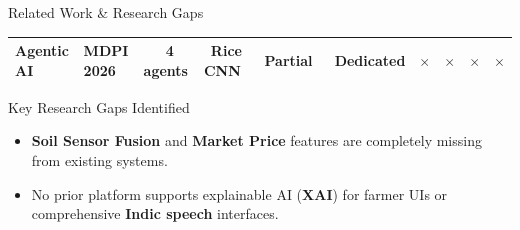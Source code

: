 \documentclass[aspectratio=169, 10pt]{beamer}
\newcommand{\ok}[1]{{\color{green!60!black}\textbf{\checkmark}\ \scriptsize #1}}
\newcommand{\ko}{{\color{red!70!black}\textbf{$\times$}}}
\begin{document}
\begin{frame}{Related Work \& Research Gaps}
{\begin{tabular}{llcccccccc}
            Agentic AI \cite{agenticmdpi2026} & MDPI 2026 & \ok{4 agents} & \ok{Rice CNN} & \ok{Partial} & \ok{Dedicated} & \ko & \ko & \ko & \ko \\
            \bottomrule
        \end{tabular}
    }
    \vspace{0.15cm}
    \begin{block}{\footnotesize Key Research Gaps Identified}
        \footnotesize
        \begin{itemize}
            \item \textbf{Soil Sensor Fusion} and \textbf{Market Price} features are completely missing from existing systems.
            \item No prior platform supports explainable AI (\textbf{XAI}) for farmer UIs or comprehensive \textbf{Indic speech} interfaces.
        \end{itemize}
    \end{block}
\end{frame}


\end{document}
